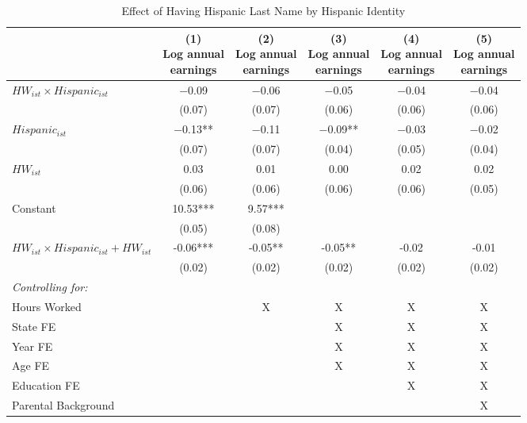 \begin{table}[H]
\caption{Effect of Having Hispanic Last Name by Hispanic Identity\label{tab:identreg}}
\begin{threeparttable}
\begin{tabular}[t]{lccccc}
\toprule
  & \specialcell{(1) \\ Log annual \\ earnings} & \specialcell{(2) \\ Log annual \\ earnings} & \specialcell{(3) \\ Log annual \\ earnings} & \specialcell{(4) \\  Log annual \\ earnings} & \specialcell{(5) \\  Log annual \\ earnings}\\
\midrule
$HW_{ist} \times Hispanic_{ist}$ & \num{-0.09} & \num{-0.06} & \num{-0.05} & \num{-0.04} & \num{-0.04}\\
 & (\num{0.07}) & (\num{0.07}) & (\num{0.06}) & (\num{0.06}) & (\num{0.06})\\
$Hispanic_{ist}$ & \num{-0.13}** & \num{-0.11} & \num{-0.09}** & \num{-0.03} & \num{-0.02}\\
 & (\num{0.07}) & (\num{0.07}) & (\num{0.04}) & (\num{0.05}) & (\num{0.04})\\
$HW_{ist}$ & \num{0.03} & \num{0.01} & \num{0.00} & \num{0.02} & \num{0.02}\\
 & (\num{0.06}) & (\num{0.06}) & (\num{0.06}) & (\num{0.06}) & (\num{0.05})\\
Constant & \num{10.53}*** & \num{9.57}*** &  &  & \\
 & (\num{0.05}) & (\num{0.08}) &  &  & \\
\midrule
$HW_{ist} \times Hispanic_{ist} + HW_{ist}$ & -0.06*** & -0.05** & -0.05** & -0.02 & -0.01\\
 & (0.02) & (0.02) & (0.02) & (0.02) & (0.02)\\
\midrule
\textit{Controlling for:} &  &  &  &  & \\
Hours Worked &  & X & X & X & X\\
State FE &  &  & X & X & X\\
Year FE &  &  & X & X & X\\
Age FE &  &  & X & X & X\\
Education FE &  &  &  & X & X\\
Parental Background &  &  &  &  & X\\

\end{tabular}
\end{threeparttable}
\end{table}

